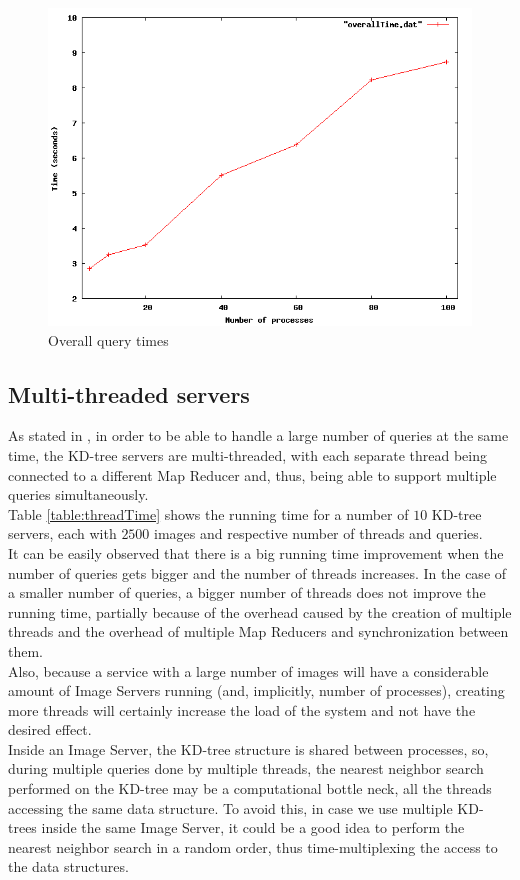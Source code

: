 \begin{figure}[H]
\centering
\includegraphics[width=.8\linewidth]{images/overallTime.png}
\caption{Overall query times}
\label{fig:overallTime}
\end{figure}

\subsection{Multi-threaded servers}

As stated in , in order to be able to handle a large number of queries at the same time, the KD-tree servers are multi-threaded, with each separate thread being connected to a different Map Reducer and, thus, being able to support multiple queries simultaneously.\\
Table \ref{table:threadTime} shows the running time for a number of $10$ KD-tree servers, each with $2500$ images and respective number of threads and queries.\\
It can be easily observed that there is a big running time improvement when the number of queries gets bigger and the number of threads increases. In the case of a smaller number of queries, a bigger number of threads does not improve the running time, partially because of the overhead caused by the creation of multiple threads and the overhead of multiple Map Reducers and synchronization between them. \\
Also, because a service with a large number of images will have a considerable amount of Image Servers running (and, implicitly, number of processes), creating more threads will certainly increase the load of the system and not have the desired effect.\\
Inside an Image Server, the KD-tree structure is shared between processes, so, during multiple queries done by multiple threads, the nearest neighbor search performed on the KD-tree may be
a computational bottle neck, all the threads accessing the same data structure.
To avoid this, in case we use multiple KD-trees inside the same Image Server, it could be a good idea to perform the nearest neighbor search in a random order, thus time-multiplexing the access to the data structures.\\

